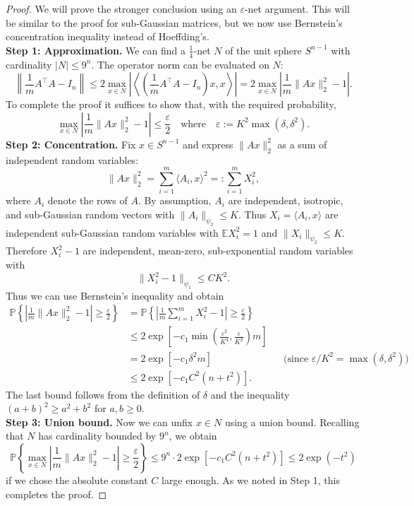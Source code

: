 \begin{proof}
We will prove the stronger conclusion using an $\varepsilon$-net argument. This will be similar to the proof for sub-Gaussian matrices, but we now use Bernstein's concentration inequality instead of Hoeffding's.
\\\textbf{Step 1: Approximation.} We can find a $\tfrac{1}{4}$-net $N$ of the unit sphere $S^{n-1}$ with cardinality $|N| \leq 9^n$. The operator norm can be evaluated on $N$:
\[
\left\| \frac{1}{m} A^\top A - I_n \right\| \leq 2 \max_{x \in N} \left| \left\langle \!\left( \frac{1}{m} A^\top A - I_n \right) x, x \right\rangle \right| = 2 \max_{x \in N} \left| \frac{1}{m} \|Ax\|_2^2 - 1 \right|.
\]
To complete the proof it suffices to show that, with the required probability,
\[
\max_{x \in N} \left| \frac{1}{m} \|Ax\|_2^2 - 1 \right| \leq \frac{\varepsilon}{2} \quad \text{where} \quad \varepsilon := K^2 \max(\delta, \delta^2).
\]
\textbf{Step 2: Concentration.} Fix $x \in S^{n-1}$ and express $\|Ax\|_2^2$ as a sum of independent random variables:
\[
\|Ax\|_2^2 = \sum_{i=1}^m \langle A_i, x \rangle^2 =: \sum_{i=1}^m X_i^2,
\]
where $A_i$ denote the rows of $A$. By assumption, $A_i$ are independent, isotropic, and sub-Gaussian random vectors with $\|A_i\|_{\psi_2} \leq K$. Thus $X_i = \langle A_i, x \rangle$ are independent sub-Gaussian random variables with $\mathbb{E} X_i^2 = 1$ and $\|X_i\|_{\psi_2} \leq K$. Therefore $X_i^2 - 1$ are independent, mean-zero, sub-exponential random variables with
\[
\|X_i^2 - 1\|_{\psi_1} \leq C K^2.
\]
Thus we can use Bernstein's inequality and obtain
\begin{align*}
\mathbb{P}\!\left\{ \left| \frac{1}{m} \|Ax\|_2^2 - 1 \right| \geq \frac{\varepsilon}{2} \right\} 
&= \mathbb{P}\!\left\{ \left| \frac{1}{m} \sum_{i=1}^m X_i^2 - 1 \right| \geq \frac{\varepsilon}{2} \right\} \\
&\leq 2 \exp\!\left[ -c_1 \min\!\left( \frac{\varepsilon^2}{K^4}, \frac{\varepsilon}{K^2} \right) m \right] \\
&= 2 \exp\!\left[ -c_1 \delta^2 m \right] && \text{(since $\varepsilon / K^2 = \max(\delta, \delta^2)$)} \\
&\leq 2 \exp\!\left[ -c_1 C^2 (n + t^2) \right].
\end{align*}
The last bound follows from the definition of $\delta$ and the inequality $(a + b)^2 \geq a^2 + b^2$ for $a, b \geq 0$.
\\\textbf{Step 3: Union bound.} Now we can unfix $x \in N$ using a union bound. Recalling that $N$ has cardinality bounded by $9^n$, we obtain
\[
\mathbb{P}\!\left\{ \max_{x \in N} \left| \frac{1}{m} \|Ax\|_2^2 - 1 \right| \geq \frac{\varepsilon}{2} \right\} \leq 9^n \cdot 2 \exp\!\left[ -c_1 C^2 (n + t^2) \right] \leq 2 \exp(-t^2)
\]
if we chose the absolute constant $C$ large enough. As we noted in Step 1, this completes the proof.
\end{proof}

